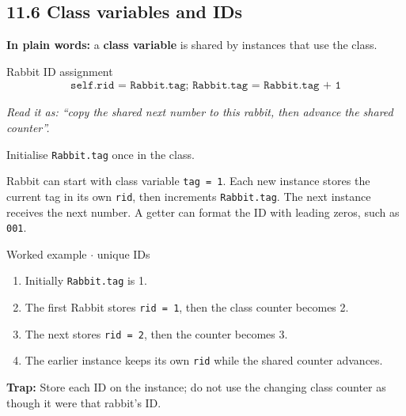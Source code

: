 \documentclass[11pt]{article}
\begin{document}
\begin{keepsection}
\section{11.6 Class variables and IDs}

\begin{plainbox}\textbf{In plain words:} a \textbf{class variable} is shared by instances that use the class.\end{plainbox}

\begin{equationcard}{Rabbit ID assignment}
\[ \begin{gathered} \texttt{self.rid = Rabbit.tag; Rabbit.tag = Rabbit.tag + 1} \end{gathered} \]
{\small \emph{Read it as: “copy the shared next number to this rabbit, then advance the shared counter”.}\par Initialise \texttt{Rabbit.tag} once in the class.}
\end{equationcard}

Rabbit can start with class variable \texttt{tag = 1}. Each new instance stores the current tag in its own \texttt{rid}, then increments \texttt{Rabbit.tag}. The next instance receives the next number. A getter can format the ID with leading zeros, such as \texttt{001}.

\begin{workedbox}{Worked example \ensuremath{\cdot} unique IDs}
\begin{enumerate}
\item Initially \texttt{Rabbit.tag} is 1.
\item The first Rabbit stores \texttt{rid = 1}, then the class counter becomes 2.
\item The next stores \texttt{rid = 2}, then the counter becomes 3.
\item The earlier instance keeps its own \texttt{rid} while the shared counter advances.
\end{enumerate}
\end{workedbox}

\begin{notebox}\textbf{Trap:} Store each ID on the instance; do not use the changing class counter as though it were that rabbit’s ID.\end{notebox}


\end{keepsection}
\end{document}
